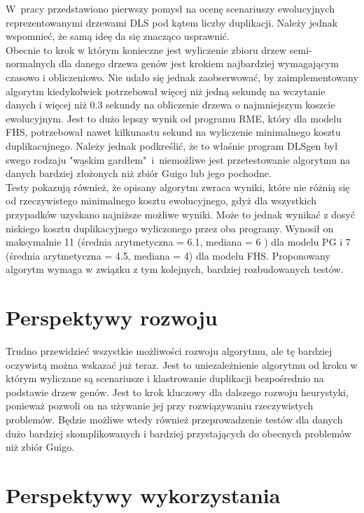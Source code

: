 \documentclass[licencjacka]{pracamgr}
\begin{document}
W~pracy przedstawiono pierwszy pomysł na ocenę scenariuszy ewolucyjnych reprezentowanymi drzewami DLS pod kątem liczby duplikacji. Należy jednak wspomnieć, że samą ideę da się znacząco usprawnić. 
\\
Obecnie to krok w którym konieczne jest wyliczenie zbioru drzew semi-normalnych dla danego drzewa genów jest krokiem najbardziej wymagającym czasowo i obliczeniowo. Nie udało się jednak zaobserwować, by zaimplementowany algorytm kiedykolwiek potrzebował więcej niż jedną sekundę na wczytanie danych i więcej niż 0.3 sekundy na obliczenie drzewa o najmniejszym koszcie ewolucyjnym. Jest to dużo lepszy wynik od programu RME, który dla modelu FHS, potrzebował nawet kilkunastu sekund na wyliczenie minimalnego kosztu duplikacujnego. 
Należy jednak podkreślić, że to właśnie program DLSgen był swego rodzaju "wąskim gardłem"~i~niemożliwe jest przetestowanie algorytmu na danych bardziej złożonych niż zbiór Guigo lub jego pochodne. 
\\
Testy pokazują również, że opisany algorytm zwraca wyniki, które nie różnią się od rzeczywistego minimalnego kosztu ewolucyjnego, gdyż dla wszystkich przypadków uzyskano najniższe możliwe wyniki. Może to jednak wynikać z dosyć niskiego kosztu duplikacyjnego wyliczonego przez oba programy. Wynosił on maksymalnie 11 (średnia arytmetyczna = 6.1, mediana = 6 ) dla modelu PG i 7 (średnia arytmetyczna = 4.5, mediana = 4) dla modelu FHS. Proponowany algorytm wymaga w związku z tym kolejnych, bardziej rozbudowanych testów.


\section{Perspektywy rozwoju}

Trudno przewidzieć wszystkie możliwości rozwoju algorytmu, ale tę bardziej
oczywistą można wskazać już teraz.  Jest to uniezależnienie algorytmu od kroku w którym wyliczane są scenariusze i klastrowanie duplikacji bezpośrednio na podstawie drzew genów. Jest to krok kluczowy dla dalszego rozwoju heurystyki, ponieważ pozwoli on na używanie jej przy rozwiązywaniu rzeczywistych problemów. Będzie możliwe wtedy również przeprowadzenie testów dla danych dużo bardziej skomplikowanych i bardziej przystających do obecnych problemów niż zbiór Guigo.

\section{Perspektywy wykorzystania}
\end{document}
